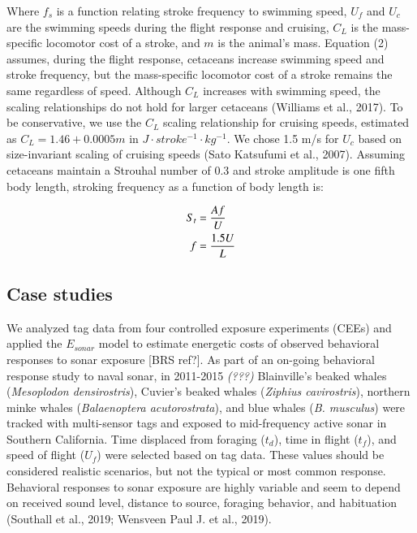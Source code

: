 \documentclass[]{elsarticle} %
\begin{document}
Where \(f_s\) is a function relating stroke frequency to swimming speed,
\(U_f\) and \(U_c\) are the swimming speeds during the flight response
and cruising, \(C_L\) is the mass-specific locomotor cost of a stroke,
and \(m\) is the animal's mass. Equation (2) assumes, during the flight
response, cetaceans increase swimming speed and stroke frequency, but
the mass-specific locomotor cost of a stroke remains the same regardless
of speed. Although \(C_L\) increases with swimming speed, the scaling
relationships do not hold for larger cetaceans (Williams et al., 2017).
To be conservative, we use the \(C_L\) scaling relationship for cruising
speeds, estimated as \(C_L = 1.46 + 0.0005m\) in
\(J \cdot stroke^{-1} \cdot kg^{-1}\). We chose 1.5 m/s for \(U_c\)
based on size-invariant scaling of cruising speeds (Sato Katsufumi et
al., 2007). Assuming cetaceans maintain a Strouhal number of 0.3 and
stroke amplitude is one fifth body length, stroking frequency as a
function of body length is:

\begin{align}
S_t &= \frac{Af}{U} \notag\\
f &= \frac{1.5U}{L}
\end{align}

\subsection{Case studies}\label{case-studies}

We analyzed tag data from four controlled exposure experiments (CEEs)
and applied the \(E_{sonar}\) model to estimate energetic costs of
observed behavioral responses to sonar exposure {[}BRS ref?{]}. As part
of an on-going behavioral response study to naval sonar, in 2011-2015
\emph{(???)} Blainville's beaked whales (\emph{Mesoplodon
densirostris}), Cuvier's beaked whales (\emph{Ziphius cavirostris}),
northern minke whales (\emph{Balaenoptera acutorostrata}), and blue
whales (\emph{B. musculus}) were tracked with multi-sensor tags and
exposed to mid-frequency active sonar in Southern California. Time
displaced from foraging (\(t_d\)), time in flight (\(t_f\)), and speed
of flight (\(U_f\)) were selected based on tag data. These values should
be considered realistic scenarios, but not the typical or most common
response. Behavioral responses to sonar exposure are highly variable and
seem to depend on received sound level, distance to source, foraging
behavior, and habituation (Southall et al., 2019; Wensveen Paul J. et
al., 2019).
\end{document}
